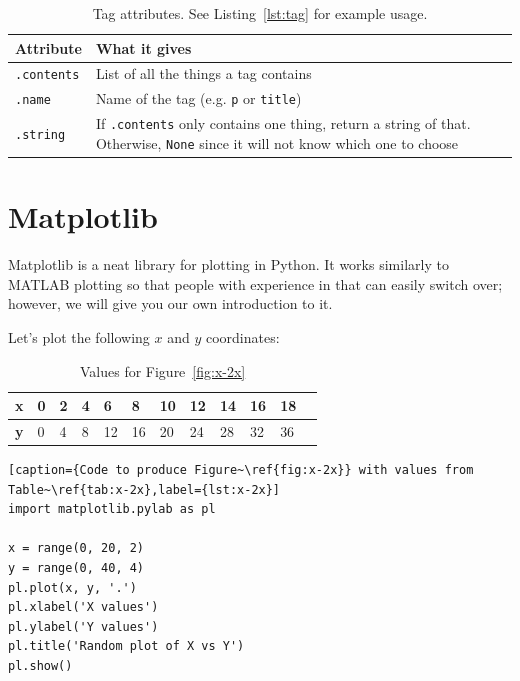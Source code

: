 \documentclass[11pt]{cselabheader}
\begin{document}
\begin{table}[!ht]
  \centering
  \begin{tabular}{p{2cm} p{12cm}}
    \toprule
    \bfseries Attribute & \bfseries What it gives \\
    \midrule
    \lstinline!.contents! & List of all the things a tag contains \\
    \lstinline!.name! & Name of the tag (e.g. \texttt{p} or \texttt{title}) \\
    \lstinline!.string! & If \lstinline!.contents! only contains one thing,
    return a string of that. Otherwise, \lstinline!None! since it will not know
    which one to choose \\
    \bottomrule
  \end{tabular}
  \caption{Tag attributes. See Listing~\ref{lst:tag} for example usage.}
  \label{tab:bsatt}
\end{table}


\pagebreak
\section{Matplotlib}

Matplotlib is a neat library for plotting in Python. It works similarly to
MATLAB plotting so that people with experience in that can easily switch over;
however, we will give you our own introduction to it.

Let's plot the following $x$ and $y$ coordinates:

\begin{table}[!ht]
  \centering
  \begin{tabular}{ llllllllllll }
    \bfseries x & 0 & 2 & 4 & 6 & 8 & 10 & 12 & 14 & 16 & 18\\
    \midrule
    \bfseries y & 0 & 4 & 8 & 12 & 16 & 20 & 24 & 28 & 32 & 36
  \end{tabular}
  \caption{Values for Figure~\ref{fig:x-2x}}
  \label{tab:x-2x}
\end{table}

\begin{lstlisting}[caption={Code to produce Figure~\ref{fig:x-2x}} with values from Table~\ref{tab:x-2x},label={lst:x-2x}]
import matplotlib.pylab as pl

x = range(0, 20, 2)
y = range(0, 40, 4)
pl.plot(x, y, '.')
pl.xlabel('X values')
pl.ylabel('Y values')
pl.title('Random plot of X vs Y')
pl.show()
\end{lstlisting}
\end{document}
